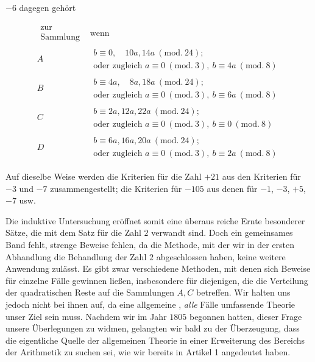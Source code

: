 \begin{center}$-6$ dagegen gehört\end{center}
{\small
\[
\begin{array}{c|l}
\substack{\text{zur}\\\text{Sammlung}}&\text{wenn}\\
A&\begin{aligned}b\equiv0,\quad10a,14a\ (\mathrm{mod.}\ 24);\\\text{oder zugleich }a\equiv0\ (\mathrm{mod.}\ 3),\ b\equiv4a\ (\mathrm{mod.}\ 8)\end{aligned}\\
B&\begin{aligned}b\equiv4a,\quad8a,18a\ (\mathrm{mod.}\ 24);\\\text{oder zugleich }a\equiv0\ (\mathrm{mod.}\ 3),\ b\equiv6a\ (\mathrm{mod.}\ 8)\end{aligned}\\
C&\begin{aligned}b\equiv2a,12a,22a\ (\mathrm{mod.}\ 24);\\\text{oder zugleich }a\equiv0\ (\mathrm{mod.}\ 3),\ b\equiv0\ (\mathrm{mod.}\ 8)\end{aligned}\\
D&\begin{aligned}b\equiv6a,16a,20a\ (\mathrm{mod.}\ 24);\\\text{oder zugleich }a\equiv0\ (\mathrm{mod.}\ 3),\ b\equiv2a\ (\mathrm{mod.}\ 8)\end{aligned}
\end{array}
\]
}

Auf dieselbe Weise werden die Kriterien für die Zahl $+21$ aus den Kriterien für $-3$ und $-7$ zusammengestellt; die Kriterien für $-105$ aus denen für $-1$, $-3$, $+5$, $-7$ usw.

Die induktive Untersuchung eröffnet somit eine überaus reiche Ernte besonderer Sätze, die mit dem Satz für die Zahl $2$ verwandt sind. Doch ein gemeinsames Band fehlt, strenge Beweise fehlen, da die Methode, mit der wir in der ersten Abhandlung die Behandlung der Zahl $2$ abgeschlossen haben, keine weitere Anwendung zulässt. Es gibt zwar verschiedene Methoden, mit denen sich Beweise für einzelne Fälle gewinnen ließen, insbesondere für diejenigen, die die Verteilung der quadratischen Reste auf die Sammlungen $A,C$ betreffen. Wir halten uns jedoch nicht bei ihnen auf, da eine allgemeine%
%
, \emph{alle} Fälle umfassende Theorie unser Ziel sein muss. Nachdem wir im Jahr $1805$ begonnen hatten, dieser Frage unsere Überlegungen zu widmen, gelangten wir bald zu der Überzeugung, dass die eigentliche Quelle der allgemeinen Theorie in einer Erweiterung des Bereichs der Arithmetik zu suchen sei, wie wir bereits in Artikel 1 angedeutet haben.

